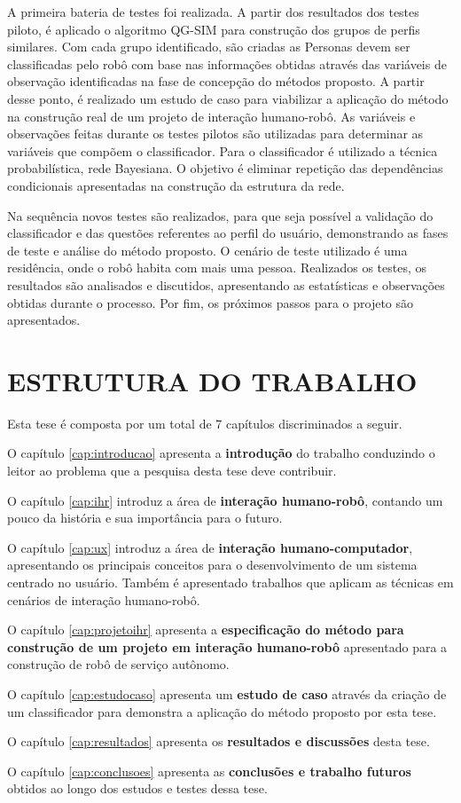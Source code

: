 A primeira bateria de testes foi realizada. A partir dos resultados dos testes piloto, é aplicado o algoritmo QG-SIM para construção dos grupos de perfis similares. Com cada grupo identificado, são criadas as Personas devem ser classificadas pelo robô com base nas informações obtidas através das variáveis de observação identificadas na fase de concepção do métodos proposto. A partir desse ponto, é realizado um estudo de caso para viabilizar a aplicação do método na construção real de um projeto de interação humano-robô. As variáveis e observações feitas durante os testes pilotos são utilizadas para determinar as variáveis que compõem o classificador. Para o classificador é utilizado a técnica probabilística, rede Bayesiana. O objetivo é eliminar repetição das dependências condicionais apresentadas na construção da estrutura da rede.

Na sequência novos testes são realizados, para que seja possível a validação do classificador e das questões referentes ao perfil do usuário, demonstrando as fases de teste e análise do método proposto. O cenário de teste utilizado é uma residência, onde o robô habita com mais uma pessoa. Realizados os testes, os resultados são analisados e discutidos, apresentando as estatísticas e observações obtidas durante o processo. Por fim, os próximos passos para o projeto são apresentados.

\section{ESTRUTURA DO TRABALHO} %
Esta tese é composta por um total de 7 capítulos discriminados a seguir.

O capítulo \ref{cap:introducao} apresenta a \textbf{introdução} do trabalho conduzindo o leitor ao problema que a pesquisa desta tese deve contribuir.

O capítulo \ref{cap:ihr} introduz a área de \textbf{interação humano-robô}, contando um pouco da história e sua importância para o futuro.

O capítulo \ref{cap:ux} introduz a área de \textbf{interação humano-computador}, apresentando os principais conceitos para o desenvolvimento de um sistema centrado no usuário. Também é apresentado trabalhos que aplicam as técnicas em cenários de interação humano-robô.

O capítulo \ref{cap:projetoihr} apresenta a \textbf{especificação do método para construção de um projeto em interação humano-robô} apresentado para a construção de robô de serviço autônomo.

O capítulo \ref{cap:estudocaso} apresenta um \textbf{estudo de caso}  através da criação de um classificador para demonstra a aplicação do método proposto por esta tese.

O capítulo \ref{cap:resultados} apresenta os \textbf{resultados e discussões} desta tese.

O capítulo \ref{cap:conclusoes} apresenta as \textbf{conclusões e trabalho futuros} obtidos ao longo dos estudos e testes dessa tese.

